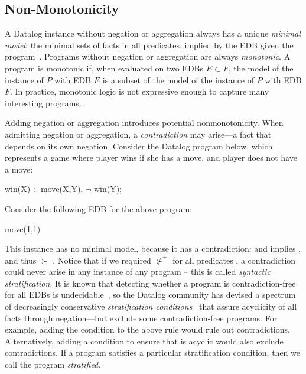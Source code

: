 \subsection{Non-Monotonicity}

A Datalog instance without negation or aggregation always has a unique {\em
minimal model}: the minimal sets of facts in all predicates, implied by the
EDB given the program~\cite{ullmanbook}.  Programs without negation or
aggregation are always {\em monotonic}.  A program is monotonic if, when
evaluated on two EDBs $E \subset F$, the model of the instance of $P$ with EDB
$E$ is a subset of the model of the instance of $P$ with EDB $F$.  In practice,
monotonic logic is not expressive enough to capture many interesting programs.

Adding negation or aggregation introduces potential nonmonotonicity.  When
admitting negation or aggregation, a {\em
contradiction} may arise---a fact that depends on its own negation.  Consider
the Datalog program below, which represents a game where player 
wins if she has a move, and player  does not have a move:

\begin{Dedalus}
win(X) :- move(X,Y), \(\lnot\) win(Y);
\end{Dedalus}

\noindent{}Consider the following EDB for the above program:

\begin{Dedalus}
move(1,1)
\end{Dedalus}

This instance has no minimal model, because it has a contradiction:
 and  implies ,
and thus  $\succ$ .  Notice that if
we required  $\not\succ^+$  for all predicates
, a contradiction could never arise in any instance of any program
-- this is called {\em syntactic stratification}.  It is known that detecting
whether a program is contradiction-free for all EDBs is
undecidable~\cite{papa-yanna}, so the Datalog community has devised a spectrum
of decreasingly conservative {\em stratification conditions}~\cite{local-strat,
ross-syntactic, modular, weak-strat} that assure acyclicity of all facts
through negation---but exclude some contradiction-free programs. For example,
adding the condition  to the above rule would rule out
contradictions.  Alternatively, adding a condition to ensure that
 is acyclic would also exclude contradictions.  If a program
satisfies a particular stratification condition, then we call the program {\em
stratified}.

